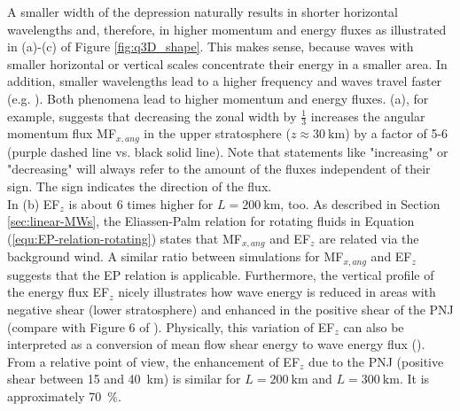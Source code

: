 A smaller width of the depression naturally results in shorter horizontal wavelengths and, therefore, in higher momentum and energy fluxes as illustrated in (a)-(c) of Figure \ref{fig:q3D_shape}. This makes sense, because waves with smaller horizontal or vertical scales concentrate their energy in a smaller area. In addition, smaller wavelengths lead to a higher frequency and waves travel faster (e.g. \cite[]{gill_atmosphere-ocean_1982}). Both phenomena lead to higher momentum and energy fluxes. (a), for example, suggests that decreasing the zonal width by $\frac{1}{3}$ increases the angular momentum flux MF$_{x,ang}$ in the upper stratosphere ($z \approx \SI{30}{\kilo\meter}$) by a factor of 5-6 (purple dashed line vs. black solid line). Note that statements like "increasing" or "decreasing" will always refer to the amount of the fluxes independent of their sign. The sign indicates the direction of the flux. \\
In (b) EF$_z$ is about 6 times higher for $L=\SI{200}{\kilo\meter}$, too. As described in Section \ref{sec:linear-MWs}, the Eliassen-Palm relation for rotating fluids in Equation (\ref{equ:EP-relation-rotating}) states that MF$_{x,ang}$ and EF$_z$ are related via the background wind. A similar ratio between simulations for MF$_{x,ang}$ and EF$_z$ suggests that the EP relation is applicable. Furthermore, the vertical profile of the energy flux EF$_z$ nicely illustrates how wave energy is reduced in areas with negative shear (lower stratosphere) and enhanced in the positive shear of the PNJ (compare with Figure 6 of \textcite[]{eliassen_transfer_1960}). Physically, this variation of EF$_z$ can also be interpreted as a conversion of mean flow shear energy to wave energy flux (\cite[]{kruse_gravity_2015}). From a relative point of view, the enhancement of EF$_z$ due to the PNJ (positive shear between 15 and \SI{40}{\kilo\meter}) is similar for $L=\SI{200}{\kilo\meter}$ and $L=\SI{300}{\kilo\meter}$. It is approximately \SI{70}{\percent}.

